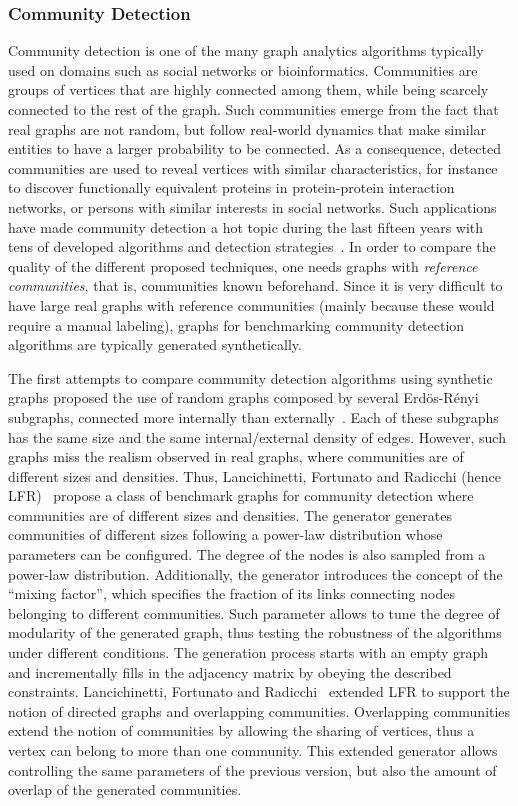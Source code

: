 \subsubsection{Community Detection}
\label{sec:generators_community_detection}

Community detection is one of the many graph analytics algorithms typically used on domains such as social networks or bioinformatics. Communities are groups of vertices that are highly connected among them, while being scarcely connected to the rest of the graph. Such communities emerge from the fact that real graphs are not random, but follow real-world dynamics that make similar entities to have a larger probability to be connected. As a consequence, detected communities are used to reveal vertices with similar characteristics, for instance to discover functionally equivalent proteins in protein-protein interaction networks, or persons with similar interests in social networks. Such applications have made community detection a hot topic during the last fifteen years with tens of developed algorithms and detection strategies~\cite{doi:10.1002/wics.1403,Kim:2015:CDM:2854006.2854013}. In order to compare the quality of the different proposed techniques, one needs graphs with \emph{reference communities}, that is, communities known beforehand. Since it is very difficult to have large real graphs with reference communities (mainly because these would require a manual labeling), graphs for benchmarking community detection algorithms are typically generated synthetically.

The first attempts to compare community detection algorithms using synthetic graphs proposed the use of random graphs composed by several Erd\"{o}s-R\'{e}nyi subgraphs, connected more internally than externally~\cite{danon2005comparing}. Each of these subgraphs has the same size and the same internal/external density of edges. However, such graphs miss the realism observed in real graphs, where communities are of different sizes and densities. Thus, Lancichinetti, Fortunato and Radicchi (hence LFR)~\cite{PhysRevE.78.046110} propose a class of benchmark graphs for community detection where communities are of different sizes and densities. The generator generates communities of different sizes following a power-law distribution whose parameters can be configured. The degree of the nodes is also sampled from a power-law distribution. Additionally, the generator introduces the concept of the ``mixing factor'', which specifies the fraction of its links connecting nodes belonging to different communities. Such parameter allows to tune the degree of modularity of the generated graph, thus testing the robustness of the algorithms under different conditions. The generation process starts with an empty graph and incrementally fills in the adjacency matrix by obeying the described constraints. Lancichinetti, Fortunato and Radicchi~\cite{PhysRevE.80.016118} extended LFR to support the notion of directed graphs and overlapping communities. Overlapping communities extend the notion of communities by allowing the sharing of vertices, thus a vertex can belong to more than one community. This extended generator allows controlling the same parameters of the previous version, but also the amount of overlap of the generated communities.


